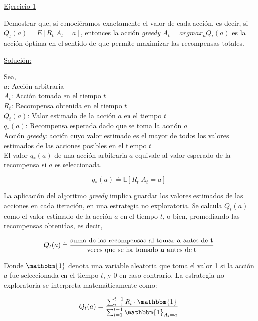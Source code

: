 \documentclass[12pt]{article}
\newlength\tindent
\renewcommand{\indent}{\hspace*{\tindent}}
\begin{document}
    \indent\underline{Ejercicio 1}

    Demostrar que, si conociéramos exactamente el valor de cada acción, es decir, si $Q_{t} (a) = E \left[ R_{t} \big| A_{t}=a \right]$, entonces la acción \textit{greedy} $ A_{t} = argmax_{a}Q_{t}(a) $ es la acción óptima en el sentido de que permite maximizar las recompensas totales.

    \indent\underline{Solución:}

    Sea,\\
    $a$: Acción arbitraria \\
    $A_{t}$: Acción tomada en el tiempo $t$ \\
    $R_{t}$: Recompensa obtenida en el tiempo $t$ \\
    $Q_{t}(a)$: Valor estimado de la acción $a$ en el tiempo $t$ \\
    $q_{*}(a)$: Recompensa esperada dado que se toma la acción $a$ \\
    Acción \textit{greedy}: acción cuyo valor estimado es el mayor de todos los valores estimados de las acciones posibles en el tiempo $t$ \\

    El valor $q_{*}(a)$ de una acción arbitraria $a$ equivale al valor esperado de la recompensa si $a$ es seleccionada.

    \[ q_{*}(a) \doteq \mathbb{E} \left[ R_{t} \big| A_{t}=a \right] \]

    La aplicación del algoritmo \textit{greedy} implica guardar los valores estimados de las acciones en cada iteración, en una estrategia no exploratoria.
    Se calcula $Q_{t}(a)$ como el valor estimado de la acción $a$ en el tiempo $t$, o bien, promediando las recompensas obtenidas, es decir,

    \begin{gather*}
        Q_{t}(a)
        \doteq
        \frac{\text{suma de las recompensas al tomar \textbf{a} antes de \textbf{t}}}
        {\text{veces que se ha tomado \textbf{a} antes de \textbf{t}}}
    \end{gather*}

    Donde $\mathbbm{1}$ denota una variable aleatoria que toma el valor 1 si la acción $a$ fue seleccionada en el tiempo $t$, y 0 en caso contrario\footnotemark.
    La estrategia no exploratoria se interpreta matemáticamente como:

    \[
        Q_t(a)= \frac{ \sum_{i=1}^{t-1} R_{i} \cdot \mathbbm{1} }{ \sum_{i=1}^{t-1} \mathbbm{1}_{A_{i}=a}}
    \]
\end{document}
